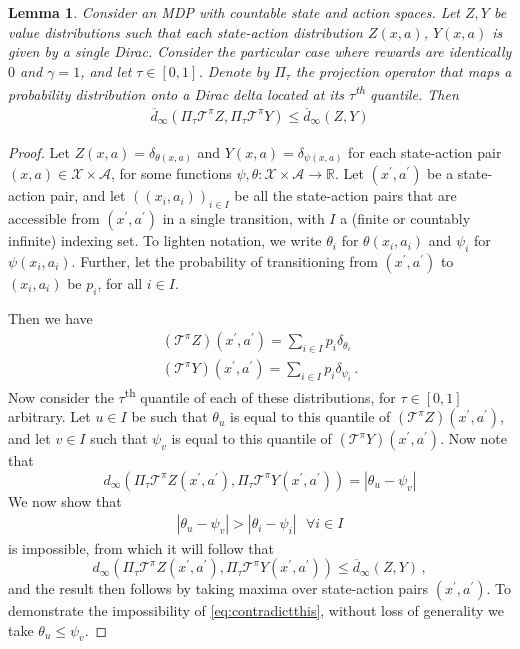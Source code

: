 \documentclass[letterpaper]{article}
\newtheorem{lem}{Lemma}
\begin{document}
\begin{lem}\label{lem:1DiracCase}Consider an MDP with countable state and action spaces.
Let $Z, Y$ be value distributions such that each state-action distribution $Z(x,a)$, $Y(x, a)$ is given by a single Dirac. Consider the particular case where rewards are identically $0$ and $\gamma=1$, and let $\tau \in [0,1]$. Denote by $\Pi_\tau$ the projection operator that maps a probability distribution onto a Dirac delta located at its $\tau$\textsuperscript{th} quantile. Then
\begin{align*}
\overline{d}_\infty( \Pi_\tau \mathcal{T}^\pi Z, \Pi_\tau \mathcal{T}^\pi Y ) \leq \overline{d}_\infty(Z, Y)
\end{align*}
\end{lem}
\begin{proof}
Let $Z(x, a) = \delta_{\theta(x, a)}$ and $Y(x, a) = \delta_{\psi(x, a)}$ for each state-action pair $(x, a) \in \mathcal{X} \times \mathcal{A}$, for some functions $\psi, \theta : \mathcal{X} \times \mathcal{A} \rightarrow \mathbb{R}$. Let $(x^\prime, a^\prime)$ be a state-action pair, and let $((x_i, a_i))_{i \in I}$ be all the state-action pairs that are accessible from $(x^\prime, a^\prime)$ in a single transition, with $I$ a (finite or countably infinite) indexing set.
To lighten notation, we write $\theta_i$ for $\theta(x_i, a_i)$ and $\psi_i$ for $\psi(x_i, a_i)$. Further, let the probability of transitioning from $(x^\prime, a^\prime)$ to $(x_i, a_i)$ be $p_i$, for all $i\in I$.

Then we have
\begin{align}
(\mathcal{T}^\pi Z)(x^\prime, a^\prime) = \sum_{i \in I} p_i \delta_{\theta_i} \\
(\mathcal{T}^\pi Y)(x^\prime, a^\prime) = \sum_{i \in I} p_i \delta_{\psi_i} \, .
\end{align}
Now consider the $\tau$\textsuperscript{th} quantile of each of these distributions, for $\tau \in [0,1]$ arbitrary. Let $u \in I$ be such that $\theta_u$ is equal to this quantile of $(\mathcal{T}^\pi Z)(x^\prime, a^\prime)$, and let $v \in I$ such that $\psi_v$ is equal to this quantile of $(\mathcal{T}^\pi Y)(x^\prime, a^\prime)$. Now note that
\[
d_\infty( \Pi_\tau \mathcal{T}^\pi Z(x^\prime, a^\prime), \Pi_\tau \mathcal{T}^\pi Y(x^\prime, a^\prime) ) = |\theta_u - \psi_v| 
\]
We now show that 
\begin{align}\label{eq:contradictthis}
|\theta_u -\psi_v | > |\theta_i - \psi_i|\ \ \ \forall i \in I
\end{align}
is impossible, from which it will follow that
\[
d_\infty( \Pi_\tau \mathcal{T}^\pi Z(x^\prime, a^\prime), \Pi_\tau \mathcal{T}^\pi Y(x^\prime, a^\prime) )  \leq \overline{d}_\infty(Z, Y) \, ,
\]
and the result then follows by taking maxima over state-action pairs $(x^\prime, a^\prime)$.
To demonstrate the impossibility of \eqref{eq:contradictthis}, 
without loss of generality we take $\theta_u \leq \psi_v$. 


\end{proof}
\end{document}
